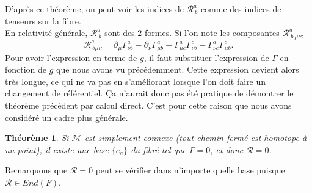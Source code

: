 \documentclass[a4paper,11pt]{report}
\theoremstyle{definition}
\theoremstyle{plain}
\newtheorem{thm}{Théorème}[chapter]
\theoremstyle{definition}
\theoremstyle{remark}
\newcommand{\M}{\mathscr{M}}
\newcommand{\p}{\partial}
\begin{document}
                D'après ce théorème, on peut voir les indices de $\mathscr{R}^a_{~b}$ comme des indices de tenseurs sur la fibre.\\
                
                En relativité générale, $\mathscr{R}^a_{~b}$ sont des $2$-formes. Si l'on note les composantes $\mathscr{R}^a_{~b~\mu\nu}$, 
                \begin{equation}
                    \mathscr{R}^a_{~b\mu\nu} = \p_\mu\Gamma^a_{\nu b}-\p_\nu\Gamma^a_{\mu b} + \Gamma^a_{\mu c}\Gamma^c_{\nu b}-\Gamma^a_{\nu c}\Gamma^c_{\mu b}.
                \end{equation}
                Pour avoir l'expression en terme de $g$, il faut substituer l'expression de $\Gamma$ en fonction de $g$ que nous avons vu précédemment. Cette expression devient alors très longue, ce qui ne va pas en s'améliorant lorsque l'on doit faire un changement de référentiel. Ça n'aurait donc pas été pratique de démontrer le théorème précédent par calcul direct. C'est pour cette raison que nous avons considéré un cadre plus générale.
                
                \begin{thm}
                    Si $\M$ est simplement connexe (tout chemin fermé est homotope à un point), il existe une base $\{e_a\}$ du fibré tel que $\Gamma = 0$, et donc $\mathscr{R} = 0$.
                \end{thm}
                
                Remarquons que $\mathscr{R} = 0$ peut se vérifier dans n'importe quelle base puisque $\mathscr{R}\in End(F)$.
                
\end{document}
